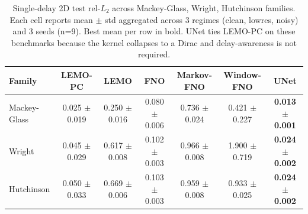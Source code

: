 \begin{table}[h]
\centering
\caption{Single-delay 2D test rel-$L_2$ across Mackey-Glass, Wright, Hutchinson families. Each cell reports mean $\pm$ std aggregated across 3 regimes (clean, lowres, noisy) and 3 seeds (n=9). Best mean per row in bold.  UNet ties LEMO-PC on these benchmarks because the kernel collapses to a Dirac and delay-awareness is not required.}
\label{tab:single-delay}
\begin{tabular}{lcccccc}
\toprule
Family & LEMO-PC & LEMO & FNO & Markov-FNO & Window-FNO & UNet \\
\midrule
Mackey-Glass & 0.025 $\pm$ 0.019 & 0.250 $\pm$ 0.016 & 0.080 $\pm$ 0.006 & 0.736 $\pm$ 0.024 & 0.421 $\pm$ 0.227 & \textbf{0.013} $\pm$ \textbf{0.001} \\
Wright & 0.045 $\pm$ 0.029 & 0.617 $\pm$ 0.008 & 0.102 $\pm$ 0.003 & 0.966 $\pm$ 0.008 & 1.900 $\pm$ 0.719 & \textbf{0.024} $\pm$ \textbf{0.002} \\
Hutchinson & 0.050 $\pm$ 0.033 & 0.669 $\pm$ 0.006 & 0.103 $\pm$ 0.003 & 0.959 $\pm$ 0.008 & 0.933 $\pm$ 0.025 & \textbf{0.024} $\pm$ \textbf{0.002} \\
\bottomrule
\end{tabular}
\end{table}